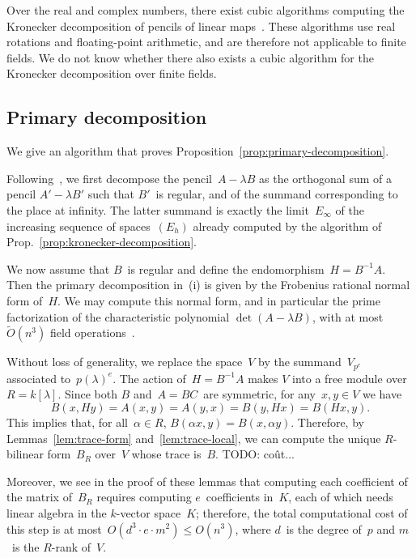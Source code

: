 \documentclass{lms}
\def\todo#1{{\color{orange}TODO: #1}}
\def\Ot{\widetilde{O}}
\begin{document}
Over the real and complex numbers,
there exist cubic algorithms computing the Kronecker decomposition
of pencils of linear maps~\cite{beelen1988improved}.
These algorithms use real rotations and floating-point arithmetic,
and are therefore not applicable to finite fields.
We do not know whether there also exists a cubic algorithm
for the Kronecker decomposition over finite fields.


\subsection{Primary decomposition}
\label{ap:primary}

We give an algorithm that proves
Proposition~\ref{prop:primary-decomposition}.

Following~\cite[Lemma 4.1]{inventiones1976waterhouse},
we first decompose the pencil~$A - λ B$ as the orthogonal sum of
a pencil $A' - λ B'$ such that $B'$~is regular,
and of the summand corresponding to the place at infinity.
The latter summand is exactly
the limit~$E_{∞}$ of the increasing sequence of spaces~$(E_{h})$
already computed by the algorithm of Prop.~\ref{prop:kronecker-decomposition}.

We now assume that $B$~is regular and define the endomorphism~$H = B^{-1} A$.
Then the primary decomposition in~(i) is given by
the Frobenius rational normal form of~$H$.
We may compute this normal form, and in particular
the prime factorization of the characteristic polynomial $\det (A - λ B)$,
with at most~$\Ot(n^3)$ field operations~\cite{kaltoffen11compute}.

\medbreak

Without loss of generality, we replace the space~$V$
by the summand~$V_{p^e}$ associated to~$p(λ)^e$.
The action of~$H = B^{-1} A$ makes $V$ into a free module over~$R = k[λ]$.
Since both $B$ and~$A=BC$~are symmetric, for any~$x, y ∈ V$ we have
\begin{equation}
B(x, H y) = A(x, y) = A(y, x) = B(y, H x) = B(H x, y).
\end{equation}
This implies that, for all~$α ∈ R$, $B(α x, y) = B(x, α y)$.
Therefore, by Lemmas~\ref{lem:trace-form} and~\ref{lem:trace-local},
we can compute the unique $R$-bilinear form~$B_R$ over~$V$ whose trace is~$B$.
\todo{coût...}

Moreover, we see in the proof of these lemmas
that computing each coefficient of the matrix of~$B_R$
requires computing $e$~coefficients in~$K$,
each of which needs linear algebra in the $k$-vector space~$K$;
therefore, the total computational cost of this step
is at most~$O(d^3 · e · m^2) ≤ O(n^3)$,
where $d$~is the degree of~$p$ and $m$~is the $R$-rank of~$V$.
\end{document}
